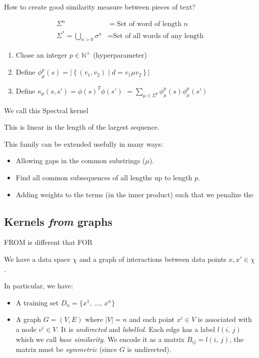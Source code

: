 \begin{question}{How to create good similarity measure between pieces of text?}{}
\end{question}

\begin{align*}
	\Sigma^n                          & = \text{Set of word of length } n       \\
	\Sigma^* = \bigcup_{n>0} \sigma^n & = \text{Set of all words of any length}
\end{align*}

\begin{enumerate}
	\item Chose an integer $p \in \mathds N^+$ (hyperparameter)
	\item Define $\phi^p_\mu(s) = \left| \left\{
		      (v_1, v_2) \mid d = v_1 \mu v_2
		      \right\} \right|$
	\item Define $\kappa_p(s, s') = \phi(s)^T \phi(s')$
	      $= \sum_{\mu \in \Sigma^p} \phi^p_\mu(s) \phi^p_\mu(s')$
\end{enumerate}

\begin{note}
	We call this Spectral kernel
\end{note}

This is linear in the length of the largest sequence.

This family can be extended usefully in many ways:
\begin{itemize}
	\item Allowing gaps in the common substrings ($\mu$).
	\item Find all common subsequences of all lengths up to length $p$.
	\item Adding weights to the terms (in the inner product) such that
	      we penalize the
\end{itemize}

\subsection{Kernels \emph{from} graphs}

\begin{marker}
	FROM is different that FOR
\end{marker}

We have a data space $\chi$ and a graph of interactions
between data points $x, x' \in \chi$.

In particular, we have:
\begin{itemize}
	\item A training set $D_n = \{x^1,\, \ldots,\, x^n\}$
	\item A graph $G = (V, E)$ where $|V| = n$ and each point $x^i \in V$
	      is associated with a node $v^i \in V$. It is
	      \emph{undirected} and \emph{labelled}.
	      Each edge has a label $l(i,\,j)$ which we call
	      \emph{base similarity}.
	      We encode it as a matrix $B_{ij} = l(i,\,j)$,
	      the matrix must be \emph{symmetric} (since $G$ is undirected).
\end{itemize}

